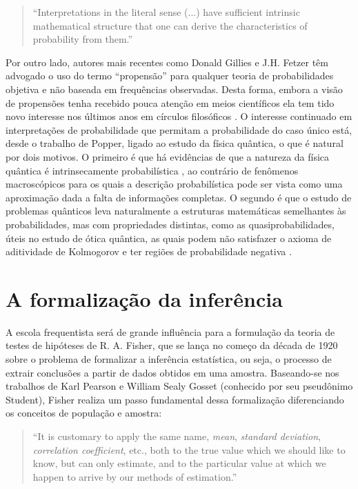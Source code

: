 \begin{quote}
``Interpretations in the literal sense (...) have sufficient intrinsic mathematical structure that one can derive
the characteristics of probability from them.''\citep{Milne93}
\end{quote}

Por outro lado, autores mais recentes como Donald Gillies e J.H. Fetzer têm advogado o uso do termo ``propensão'' para
qualquer teoria de probabilidades objetiva e não baseada em frequências observadas.
Desta forma, embora a visão de propensões tenha recebido pouca atenção em meios científicos
ela tem tido novo interesse nos últimos anos em círculos filosóficos \citep{Gillies2000}. 
O interesse continuado em interpretações de probabilidade que permitam a probabilidade do caso único
está, desde o trabalho de Popper, ligado ao estudo da física quântica, o que é natural por dois motivos.
O primeiro é que há evidências de que a natureza da física quântica é intrinsecamente probabilística \citep{Gudder88}, 
ao contrário de fenômenos
macroscópicos para os quais a descrição probabilística pode ser vista como uma aproximação dada a falta de informações completas.
O segundo é que o estudo de problemas quânticos leva naturalmente a estruturas matemáticas semelhantes às probabilidades, mas
com propriedades distintas, como as quasiprobabilidades, úteis no estudo de ótica quântica, as quais podem não satisfazer o
axioma de aditividade de Kolmogorov e ter regiões de probabilidade
negativa \citep{Mandel95}.

\section{A formalização da inferência}\label{sec:infer}

A escola frequentista será de grande influência para a formulação da teoria de testes de hipóteses de R. A. Fisher, que se
lança no começo da década de 1920 sobre o problema de formalizar a inferência estatística, ou seja, o processo de
extrair conclusões a partir de dados obtidos em uma amostra. Baseando-se nos trabalhos de Karl Pearson e William Sealy Gosset
(conhecido por seu pseudônimo Student), Fisher realiza um passo fundamental dessa formalização
diferenciando os conceitos de população e amostra:

\begin{quote}
``It is customary to apply the same name, {\em mean}, {\em standard deviation}, {\em correlation coefficient}, etc., both 
to the true value which we should like to know, but can only estimate, and to the particular value at which we happen 
to arrive by our methods of estimation.''\citep{Fisher1922}
\end{quote}

